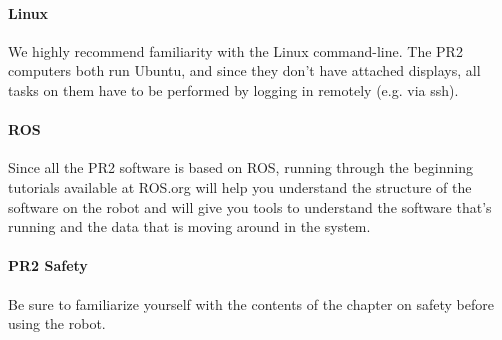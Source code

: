 \paragraph{Linux} We highly recommend familiarity with the Linux command-line.  The PR2 computers both run Ubuntu, and since they don't have attached displays, all tasks on them have to be performed by logging in remotely (e.g. via ssh).
\paragraph{ROS} Since all the PR2 software is based on ROS, running through the beginning tutorials available at ROS.org will help you understand the structure of the software on the robot and will give you tools to understand the software that's running and the data that is moving around in the system.
\paragraph{PR2 Safety} Be sure to familiarize yourself with the contents of the chapter on safety before using the robot.
